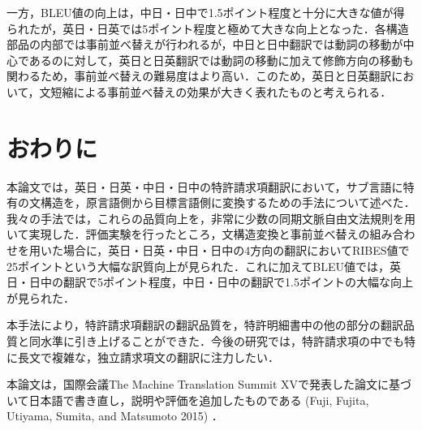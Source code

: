 \documentclass[japanese]{jnlp_1.4}
\begin{document}
一方，BLEU値の向上は，中日・日中で1.5ポイント程度と十分に大きな値が得られたが，英日・日英では5ポイント程度と極めて大きな向上となった．各構造部品の内部では事前並べ替えが行われるが，中日と日中翻訳では動詞の移動が中心であるのに対して，英日と日英翻訳では動詞の移動に加えて修飾方向の移動も関わるため，事前並べ替えの難易度はより高い．このため，英日と日英翻訳において，文短縮による事前並べ替えの効果が大きく表れたものと考えられる．


\section{おわりに}

本論文では，英日・日英・中日・日中の特許請求項翻訳において，サブ言語に特有の文構造を，原言語側から目標言語側に変換するための手法について述べた．我々の手法では，これらの品質向上を，非常に少数の同期文脈自由文法規則を用いて実現した．評価実験を行ったところ，文構造変換と事前並べ替えの組み合わせを用いた場合に，英日・日英・中日・日中の4方向の翻訳においてRIBES値で25ポイントという大幅な訳質向上が見られた．これに加えてBLEU値では，英日・日中の翻訳で5ポイント程度，中日・日中の翻訳で1.5ポイントの大幅な向上が見られた．

本手法により，特許請求項翻訳の翻訳品質を，特許明細書中の他の部分の翻訳品質と同水準に引き上げることができた．今後の研究では，特許請求項の中でも特に長文で複雑な，独立請求項文の翻訳に注力したい．

\acknowledgment

本論文は，国際会議The Machine Translation Summit 
XVで発表した論文に基づいて日本語で書き直し，説明や評価を追加したものである (Fuji, 
Fujita, Utiyama, Sumita, and Matsumoto 2015) ．
\end{document}
